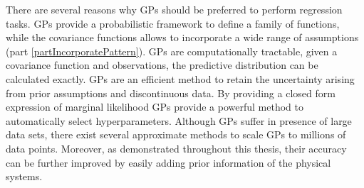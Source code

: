 There are several reasons why GPs should be preferred to perform regression tasks. GPs provide a probabilistic framework to define a family of functions, while the covariance functions allows to incorporate a wide range of assumptions (part \ref{partIncorporatePattern}). GPs are computationally tractable, given a covariance function and observations, the predictive distribution can be calculated exactly. GPs are an efficient method to retain the uncertainty arising from prior assumptions and discontinuous data. By providing a closed form expression of marginal likelihood GPs provide a powerful method to automatically select hyperparameters. Although GPs suffer in presence of large data sets, there exist several approximate methods to scale GPs to millions of data points. Moreover, as demonstrated throughout this thesis, their accuracy can be further improved by easily adding prior information of the physical systems.